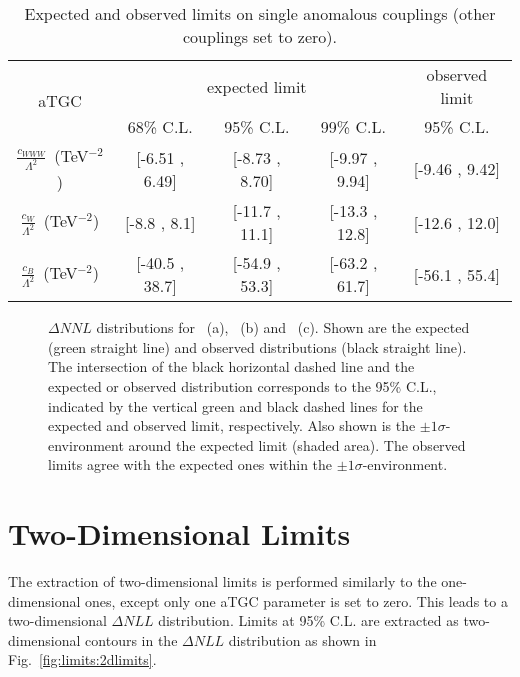 \begin{table}
	\centering
	\caption[Expected and observed limits on single anomalous couplings]{Expected and observed limits on single anomalous couplings (other couplings set to zero).}
	\label{tab:limits:1dlimits}
	\begin{tabular}{ccccc}
	\hline
	\multirow{2}{*}{aTGC}              &     \multicolumn{3}{c}{expected limit} & observed limit\\
	& 68\% C.L. & 95\% C.L. & 99\% C.L. & 95\% C.L.\\
	\hline
	$\frac{c_{WWW}}{\Lambda ^2}$~(TeV$^{-2}$) & [-6.51 , 6.49] & [-8.73 , 8.70] & [-9.97 , 9.94] & [-9.46 , 9.42] \\
	$\frac{c_{W}}{\Lambda ^2}$~(TeV$^{-2}$)   & [-8.8 , 8.1]   & [-11.7 , 11.1] & [-13.3 , 12.8] & [-12.6 , 12.0] \\
	$\frac{c_{B}}{\Lambda ^2}$~(TeV$^{-2}$)   & [-40.5 , 38.7] & [-54.9 , 53.3] & [-63.2 , 61.7] & [-56.1 , 55.4] \\
	\hline
	\end{tabular}
\end{table}

\begin{figure}
	\centering
	\caption[Delta-log-likelihood distributions for the three aTGC parameters]{$\Delta NNL$ distributions for \Tcwww \ (a), \Tccw \ (b) and \Tcb \ (c). Shown are the expected (green straight line) and observed distributions (black straight line). The intersection of the black horizontal dashed line and the expected or observed distribution corresponds to the 95\% C.L., indicated by the vertical green and black dashed lines for the expected and observed limit, respectively. Also shown is the $\pm 1\sigma$-environment around the expected limit (shaded area). The observed limits agree with the expected ones within the $\pm 1\sigma$-environment.}
	\label{fig:limits:1dlimits}
\end{figure}

\section{Two-Dimensional Limits}
\label{sec:2dlims}
The extraction of two-dimensional limits is performed similarly to the one-dimensional ones, except only one aTGC parameter is set to zero. This leads to a two-dimensional $\Delta NLL$ distribution. Limits at 95\% C.L. are extracted as two-dimensional contours in the $\Delta NLL$ distribution as shown in Fig.~\ref{fig:limits:2dlimits}.\\

